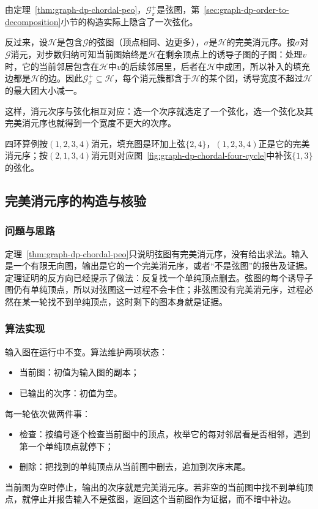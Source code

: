 由定理~\ref{thm:graph-dp-chordal-peo}，$\mathcal G^+_\pi$是弦图，第~\ref{sec:graph-dp-order-to-decomposition}小节的构造实际上隐含了一次弦化。

反过来，设$\mathcal H$是包含$\mathcal G$的弦图（顶点相同、边更多），$\sigma$是$\mathcal H$的完美消元序。按$\sigma$对$\mathcal G$消元，对步数归纳可知当前图始终是$\mathcal H$在剩余顶点上的诱导子图的子图：处理$v$时，它的当前邻居包含在$\mathcal H$中$v$的后续邻居里，后者在$\mathcal H$中成团，所以补入的填充边都是$\mathcal H$的边。因此$\mathcal G^+_\sigma\subseteq\mathcal H$，每个消元簇都含于$\mathcal H$的某个团，诱导宽度不超过$\mathcal H$的最大团大小减一。

这样，消元次序与弦化相互对应：选一个次序就选定了一个弦化，选一个弦化及其完美消元序也就得到一个宽度不更大的次序。

四环算例按$(1,2,3,4)$消元，填充图是环加上弦$\{2,4\}$，$(1,2,3,4)$正是它的完美消元序；按$(2,1,3,4)$消元则对应图~\ref{fig:graph-dp-chordal-four-cycle}中补弦$\{1,3\}$的弦化。

\subsection{完美消元序的构造与核验}
\label{sec:graph-dp-peo-construction}

\subsubsection{问题与思路}

定理~\ref{thm:graph-dp-chordal-peo}只说明弦图有完美消元序，没有给出求法。输入是一个有限无向图，输出是它的一个完美消元序，或者“不是弦图”的报告及证据。定理证明的反方向已经提示了做法：反复找一个单纯顶点删去。弦图的每个诱导子图仍有单纯顶点，所以对弦图这一过程不会卡住；非弦图没有完美消元序，过程必然在某一轮找不到单纯顶点，这时剩下的图本身就是证据。

\subsubsection{算法实现}

输入图在运行中不变。算法维护两项状态：
\begin{itemize}
  \item 当前图：初值为输入图的副本；
  \item 已输出的次序：初值为空。
\end{itemize}
每一轮依次做两件事：
\begin{itemize}
  \item 检查：按编号逐个检查当前图中的顶点，枚举它的每对邻居看是否相邻，遇到第一个单纯顶点就停下；
  \item 删除：把找到的单纯顶点从当前图中删去，追加到次序末尾。
\end{itemize}
当前图为空时停止，输出的次序就是完美消元序。若非空的当前图中找不到单纯顶点，就停止并报告输入不是弦图，返回这个当前图作为证据，而不暗中补边。

